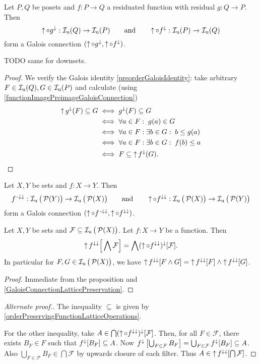 \begin{proposition} \label{upsetResiduatedImageGaloisConnection}
Let $P,Q$ be posets and $f: P\to Q$ a residuated function with residual $g: Q\to P$. Then
\[ \operatorname{\uparrow}\circ g^{\downarrow}: \operatorname{\mathcal{I}_u}(Q) \to \operatorname{\mathcal{I}_u}(P) \qquad\text{and}\qquad \operatorname{\uparrow}\circ f^{\downarrow}: \operatorname{\mathcal{I}_u}(P) \to \operatorname{\mathcal{I}_u}(Q) \]
form a Galois connection $(\operatorname{\uparrow}\circ g^{\downarrow}, \operatorname{\uparrow}\circ f^{\downarrow})$.
\end{proposition}
TODO same for downsets.
\begin{proof}
We verify the Galois identity \ref{preorderGaloisIdentity}: take arbitrary $F\in \operatorname{\mathcal{I}_u}(Q), G\in \operatorname{\mathcal{I}_u}(P)$ and calculate (using \ref{functionImagePreimageGaloisConnection})
\begin{align*}
\operatorname{\uparrow} g^{\downarrow}(F) \subseteq G &\iff g^\downarrow(F) \subseteq G \\
&\iff \forall a\in F: \; g(a) \in G \\
&\iff \forall a\in F: \exists b\in G: \; b \leq g(a) \\
&\iff \forall a\in F: \exists b\in G: \; f(b) \leq a \\
&\iff F \subseteq \operatorname{\uparrow} f^{\downarrow}(G).
\end{align*}
\end{proof}
\begin{corollary} \label{upsetPreimageImageGaloisConnection}
Let $X, Y$ be sets and $f: X\to Y$. Then
\[ f^{{\text{\hspace{0.15em}-}\downarrow}\downarrow}: \operatorname{\mathcal{I}_u}\big(\operatorname{\mathcal{P}}(Y)\big) \to \operatorname{\mathcal{I}_u}\big(\operatorname{\mathcal{P}}(X)\big) \qquad\text{and}\qquad \operatorname{\uparrow}\circ f^{\downarrow\downarrow}: \operatorname{\mathcal{I}_u}\big(\operatorname{\mathcal{P}}(X)\big) \to \operatorname{\mathcal{I}_u}\big(\operatorname{\mathcal{P}}(Y)\big) \]
form a Galois connection $(\operatorname{\uparrow}\circ f^{{\text{\hspace{0.15em}-}\downarrow}\downarrow}, \operatorname{\uparrow}\circ f^{\downarrow\downarrow})$.
\end{corollary}
\begin{corollary} \label{imageUpsetsPreservesIntersection}
Let $X, Y$ be sets and $\mathcal{F}\subseteq\operatorname{\mathcal{I}_u}\big(\operatorname{\mathcal{P}}(X)\big)$. Let $f:X\to Y$ be a function. Then
\[ \operatorname{\uparrow} f^{\downarrow\downarrow}\Big[\bigwedge \mathcal{F}\Big] = \bigwedge (\operatorname{\uparrow}\circ f^{\downarrow\downarrow})^{\downarrow}[\mathcal{F}]. \]
In particular for $F,G\in \operatorname{\mathcal{I}_u}\big(\operatorname{\mathcal{P}}(X)\big)$, we have $\operatorname{\uparrow} f^{\downarrow\downarrow}[F\wedge G] = \operatorname{\uparrow} f^{\downarrow\downarrow}[F] \wedge \operatorname{\uparrow} f^{\downarrow\downarrow}[G]$.
\end{corollary}
\begin{proof}
Immediate from the proposition and \ref{GaloisConnectionLatticePreservation}.
\end{proof}
\begin{proof}[Alternate proof.]
The inequality $\subseteq$ is given by \ref{orderPreservingFunctionLatticeOperations}.

For the other inequality, take $A\in \bigcap (\operatorname{\uparrow}\circ f^{\downarrow\downarrow})^{\downarrow}[\mathcal{F}]$. Then, for all $F\in\mathcal{F}$, there exists $B_F\in F$ such that $f^{\downarrow}[B_F] \subseteq A$. Now $f^{\downarrow}\left[\bigcup_{F\in\mathcal{F}}B_F\right] = \bigcup_{F\in\mathcal{F}}f^{\downarrow}[B_F] \subseteq A$. Also $\bigcup_{F\in\mathcal{F}}B_F \in \bigcap \mathcal{F}$ by upwards closure of each filter. Thus $A\in \operatorname{\uparrow} f^{\downarrow\downarrow}[\bigcap \mathcal{F}]$.
\end{proof}

